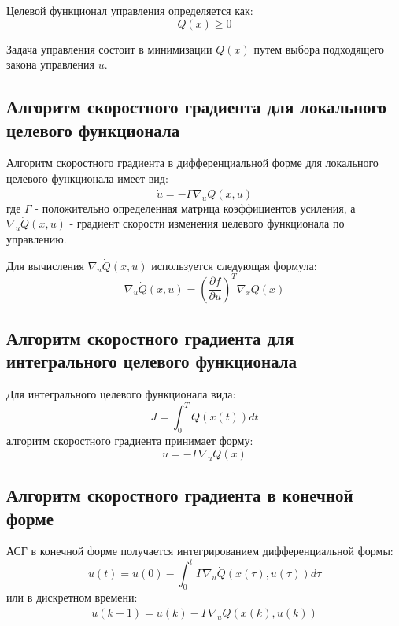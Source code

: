 \documentclass[14pt,a4paper]{article}
\begin{document}
Целевой функционал управления определяется как:
\begin{equation}
    Q(x) \geq 0
\end{equation}

Задача управления состоит в минимизации $Q(x)$ путем выбора подходящего закона управления $u$.

\subsection{Алгоритм скоростного градиента для локального целевого функционала}
Алгоритм скоростного градиента в дифференциальной форме для локального целевого функционала имеет вид:
\begin{equation}
    \dot{u} = -\Gamma \nabla_u \dot{Q}(x,u)
\end{equation}
где $\Gamma$ - положительно определенная матрица коэффициентов усиления, а $\nabla_u \dot{Q}(x,u)$ - градиент скорости изменения целевого функционала по управлению.

Для вычисления $\nabla_u \dot{Q}(x,u)$ используется следующая формула:
\begin{equation}
    \nabla_u \dot{Q}(x,u) = \left(\frac{\partial f}{\partial u}\right)^T \nabla_x Q(x)
\end{equation}

\subsection{Алгоритм скоростного градиента для интегрального целевого функционала}
Для интегрального целевого функционала вида:
\begin{equation}
    J = \int_0^T Q(x(t))dt
\end{equation}
алгоритм скоростного градиента принимает форму:
\begin{equation}
    \dot{u} = -\Gamma \nabla_u Q(x)
\end{equation}

\subsection{Алгоритм скоростного градиента в конечной форме}
АСГ в конечной форме получается интегрированием дифференциальной формы:
\begin{equation}
    u(t) = u(0) - \int_0^t \Gamma \nabla_u \dot{Q}(x(\tau),u(\tau))d\tau
\end{equation}
или в дискретном времени:
\begin{equation}
    u(k+1) = u(k) - \Gamma \nabla_u \dot{Q}(x(k),u(k))
\end{equation}
\end{document}

